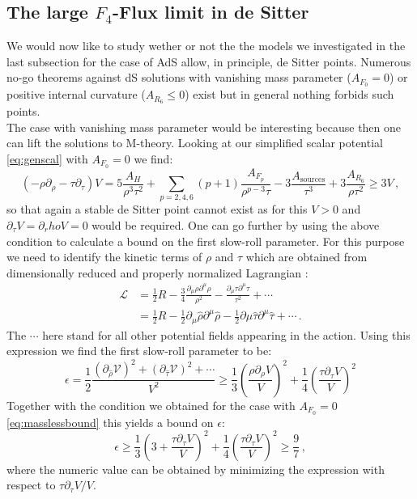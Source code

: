 \documentclass[12pt]{report}
\newcommand{\be}{\begin{equation}}
\newcommand{\ee}{\end{equation}}
\newcommand{\bea}{\begin{equation}\begin{aligned}}
\newcommand{\eea}{\end{aligned}\end{equation}}
\newcommand{\V}{\mathcal{V}}
\begin{document}
\subsection{The large $F_4$-Flux limit in de Sitter}
We would now like to study wether or not the the models we investigated in the last subsection for the case of AdS allow, in principle, de Sitter points. Numerous no-go theorems against dS solutions with vanishing mass parameter ($A_{F_0} = 0$) or positive internal curvature ($A_{R_6}\leq 0$) exist \cite{Wrase:2010ew,Flauger:2008ad,Junghans:2016uvg} but in general nothing forbids such points.\\
The case with vanishing mass parameter would be interesting because then one can lift the solutions to M-theory. Looking at our simplified scalar potential \eqref{eq:genscal} with $A_{F_0} = 0$ we find:
\be 
\left( - \rho \partial_\rho - \tau \partial_\tau \right) V = 5 \frac{A_{H}}{\rho^ 3 \tau^2} + \sum_{p=2,4,6} (p+1) \frac{A_{F_p}}{\rho^ {p-3} \tau} - 3 \frac{A_{\text{sources}}}{\tau^3} + 3 \frac{A_{R_6}}{\rho \tau^2} \geq 3 V\,,
\label{eq:masslessbound}
\ee 
so that again a stable de Sitter point cannot exist as for this $V>0$ and $\partial_\tau V = \partial_rho V = 0$ would be required. One can go further by using the above condition to calculate a bound on the first slow-roll parameter. For this purpose we need to identify the kinetic terms of $\rho$ and $\tau$ which are obtained from dimensionally reduced and properly normalized Lagrangian \cite{Hertzberg:2007wc}:
\bea
\mathcal{L} &= \frac{1}{2} R - \frac{3}{4} \frac{\partial_\mu \rho \partial^ \mu \rho}{\rho^ 2} - \frac{\partial_\mu \tau \partial^ \mu \tau}{\tau^ 2} + \cdots\\
&= \frac{1}{2} R - \frac{1}{2} \partial_\mu \hat{\rho} \partial^ \mu \hat{\rho} - \frac{1}{2} \partial\mu \hat{\tau} \partial^ \mu \hat{\tau} + \cdots \,.
\eea
The $\cdots$ here stand for all other potential fields appearing in the action. Using this expression we find the first slow-roll parameter to be:
\be
\epsilon=\frac{1}{2} \frac{(\partial_{\hat{\rho}}\V)^ 2 + (\partial_{\hat{\tau}}\V)^ 2 + \cdots}{V^ 2} \geq \frac{1}{3} \left( \frac{\rho \partial_\rho V}{V}\right)^ 2 + \frac{1}{4} \left( \frac{\tau \partial_\tau V}{V} \right)^2
\ee
Together with the condition we obtained for the case with $A_{F_0} = 0$ \eqref{eq:masslessbound} this yields a bound on $\epsilon$:
\be
\epsilon \geq \frac{1}{3} \left(3+\frac{\tau \partial_\tau V}{V} \right)^2 + \frac{1}{4} \left( \frac{\tau \partial_\tau V}{V} \right)^2\geq \frac{9}{7}\,,
\ee
where the numeric value can be obtained by minimizing the expression with respect to $\tau \partial_\tau V/V$.\\
\end{document}
